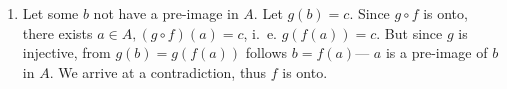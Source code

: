 \begin{description}
\begin{enumerate}
\item Let some $b$ not have a pre-image in $A$. Let $g(b) = c$. Since
$g \circ f$ is onto, there exists $a \in A, (g \circ f)(a) = c$, i.\ e.
$g (f(a)) = c$. But since $g$ is injective, from $g(b) = g(f(a))$ follows
$b = f(a)$--- $a$ is a pre-image of $b$ in $A$. We arrive at a contradiction,
thus $f$ is onto.

\end{enumerate}
\end{description}

